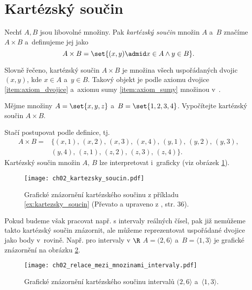 \section{Kartézský součin}\label{sec:kartezsky_soucin}
\begin{definition}\label{def:kartezsky_soucin}
    Nechť $A,B$ jsou libovolné množiny. Pak \emph{kartézský součin} množin $A$ a~$B$ značíme $A\times B$ a~definujeme jej jako
    \begin{equation*}
        A\times B=\set{(x,y) \admid x\in A \land y\in B}.
    \end{equation*}
\end{definition}
Slovně řečeno, kartézský součin $A\times B$ je množina všech uspořádaných dvojic $(x,y)$, kde $x\in A$ a~$y\in B$. Takový objekt je podle axiomu dvojice \ref{item:axiom_dvojice} a~axiomu sumy \ref{item:axiom_sumy} množinou v~\ZF{}.
\begin{example}\label{ex:kartezsky_soucin}
    Mějme množiny $A=\set{x,y,z}$ a~$B=\set{1,2,3,4}$. Vypočítejte kartézský součin $A\times B$.
\end{example}
\begin{solution}
    Stačí postupovat podle definice, tj.
    \begin{align*}
        A\times B=&\{(x,1),\,(x,2),\,(x,3),\,(x,4),\,(y,1),\,(y,2),\,(y,3),\\
        &(y,4),\,(z,1),\,(z,2),\,(z,3),\,(z,4)\}.
    \end{align*}
    Kartézský součin množin $A,\,B$ lze interpretovat i~graficky (viz obrázek \ref{fig:kartezsky_soucin}).
\end{solution}
\begin{figure}[H]
    \centering
    \texttt{[image: ch02\_kartezsky\_soucin.pdf]}
    \caption{Grafické znázornění kartézského součinu z příkladu \ref{ex:kartezsky_soucin} (Převato a upraveno z \cite{MatousekNesetril2009}, str. 36).}
    \label{fig:kartezsky_soucin}
\end{figure}
Pokud budeme však pracovat např. s intervaly reálných čísel, pak již nemůžeme takto kartézský součin znázornit, ale můžeme reprezentovat uspořádané dvojice jako body v~rovině. Např. pro intervaly v $\R$ $A=(2, 6\rangle$ a~$B=\langle 1,3 \rangle$ je grafické znázornění na obrázku \ref{fig:kartezsky_soucin_intervaly}.
\begin{figure}[H]
    \centering
    \texttt{[image: ch02\_relace\_mezi\_mnozinami\_intervaly.pdf]}
    \caption{Grafické znázornění kartézského součinu intervalů $(2, 6\rangle$ a~$\langle 1,3 \rangle$.}
    \label{fig:kartezsky_soucin_intervaly}
\end{figure}
